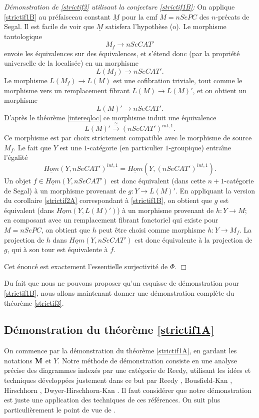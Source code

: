 \documentclass[12pt]{article}
\newcommand{\subnumero}[1]{\subsection*{#1}\phantomsection\addcontentsline{toc}{subsection}{#1}}
\newcommand{\eop}{\hfill $\Box$\vspace{.1in}}
\newcommand{\mm}{{\bf M}}
\begin{document}
{\em D\'emonstration de \ref{strictif3} utilisant la conjecture
\ref{strictif1B}:}
On applique \ref{strictif1B} au pr\'efaisceau constant $\underline{M}$ pour
la cmf
$M=nSePC$ des $n$-pr\'ecats de Segal. Il est facile de voir que
$\underline{M}$ satisfera
l'hypoth\`ese (o). Le morphisme tautologique
$$
M_f \rightarrow nSeCAT'
$$
envoie les \'equivalences sur
des \'equivalences, et s'\'etend donc (par la propri\'et\'e
universelle de la localis\'ee) en un morphisme
$$
L(M_f) \rightarrow nSeCAT'.
$$
Le morphisme $L(M_f)\rightarrow L(M)$ est une cofibration triviale,
tout comme le morphisme vers un remplacement fibrant
$L(M)\rightarrow L(M)'$, et on obtient un
morphisme
$$
L(M)' \rightarrow nSeCAT'.
$$
D'apr\`es le th\'eor\`eme \ref{intereqloc} ce
morphisme induit une \'equivalence
$$
L(M)' \stackrel{\cong}{\rightarrow} (nSeCAT')^{int, 1}.
$$
Ce morphisme est par choix strictement compatible avec le morphisme de
source $M_f$. Le fait que $Y$ est une $1$-cat\'egorie (en particulier
$1$-groupique) entra\^{\i}ne l'\'egalit\'e
$$
\underline{Hom}(Y, nSeCAT')^{int, 1} =
\underline{Hom}(Y, (nSeCAT')^{int, 1}).
$$
Un objet  $f\in \underline{Hom}(Y, nSeCAT')$ est donc \'equivalent (dans cette
$n+1$-cat\'egorie de Segal) \`a un morphisme provenant de
$g: Y\rightarrow L(M)'$. En appliquant la version du corollaire
\ref{strictif2A}
correspondant \`a \ref{strictif1B}, on obtient que $g$ est
\'equivalent (dans $\underline{Hom}(Y, L(M)')$) \`a un morphisme provenant de
$h: Y\rightarrow M$; en composant avec un remplacement fibrant fonctoriel qui
existe pour $M=nSePC$, on obtient que $h$  peut \^etre choisi comme
morphisme $h:
Y\rightarrow M_f$. La projection de $h$ dans $\underline{Hom}(Y, nSeCAT')$ est
donc \'equivalente \`a la projection de $g$, qui \`a son tour est \'equivalente
\`a $f$.

Cet \'enonc\'e est exactement l'essentielle surjectivit\'e de $\Phi$.
\eop

Du fait que nous ne pouvons proposer qu'un esquisse de
d\'emonstration pour \ref{strictif1B}, nous allons
maintenant donner une d\'emonstration
compl\`ete du th\'eor\`eme \ref{strictif3}.




\subnumero{D\'emonstration du th\'eor\`eme \ref{strictif1A}}
On commence par la d\'emonstration du th\'eor\`eme \ref{strictif1A},
en gardant les notations $\mm$ et $Y$. Notre m\'ethode de d\'emonstration
consiste en
une analyse pr\'ecise des diagrammes index\'es par une cat\'egorie de Reedy,
utilisant les id\'ees et techniques d\'evelopp\'ees justement
dans ce but par Reedy
\cite{Reedy}, Bousfield-Kan \cite{BousfieldKan}, Hirschhorn \cite{Hirschhorn},
Dwyer-Hirschhorn-Kan \cite{DHK}. Il faut consid\'erer que notre d\'emonstration
est juste une application des techniques de ces r\'ef\'erences. On suit plus
particuli\`erement le point de vue de \cite{Hirschhorn}.
\end{document}
